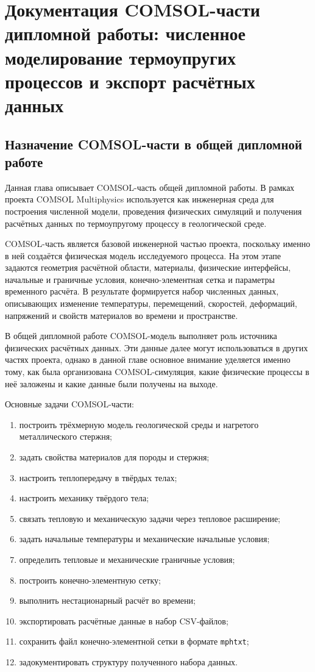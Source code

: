 \chapter{Документация COMSOL-части дипломной работы: численное моделирование термоупругих процессов и экспорт расчётных данных}

\section{Назначение COMSOL-части в общей дипломной работе}

Данная глава описывает COMSOL-часть общей дипломной работы. В рамках проекта COMSOL Multiphysics используется как инженерная среда для построения численной модели, проведения физических симуляций и получения расчётных данных по термоупругому процессу в геологической среде.

COMSOL-часть является базовой инженерной частью проекта, поскольку именно в ней создаётся физическая модель исследуемого процесса. На этом этапе задаются геометрия расчётной области, материалы, физические интерфейсы, начальные и граничные условия, конечно-элементная сетка и параметры временного расчёта. В результате формируется набор численных данных, описывающих изменение температуры, перемещений, скоростей, деформаций, напряжений и свойств материалов во времени и пространстве.

В общей дипломной работе COMSOL-модель выполняет роль источника физических расчётных данных. Эти данные далее могут использоваться в других частях проекта, однако в данной главе основное внимание уделяется именно тому, как была организована COMSOL-симуляция, какие физические процессы в неё заложены и какие данные были получены на выходе.

Основные задачи COMSOL-части:

\begin{enumerate}
    \item построить трёхмерную модель геологической среды и нагретого металлического стержня;
    \item задать свойства материалов для породы и стержня;
    \item настроить теплопередачу в твёрдых телах;
    \item настроить механику твёрдого тела;
    \item связать тепловую и механическую задачи через тепловое расширение;
    \item задать начальные температуры и механические начальные условия;
    \item определить тепловые и механические граничные условия;
    \item построить конечно-элементную сетку;
    \item выполнить нестационарный расчёт во времени;
    \item экспортировать расчётные данные в набор CSV-файлов;
    \item сохранить файл конечно-элементной сетки в формате \texttt{mphtxt};
    \item задокументировать структуру полученного набора данных.
\end{enumerate}

